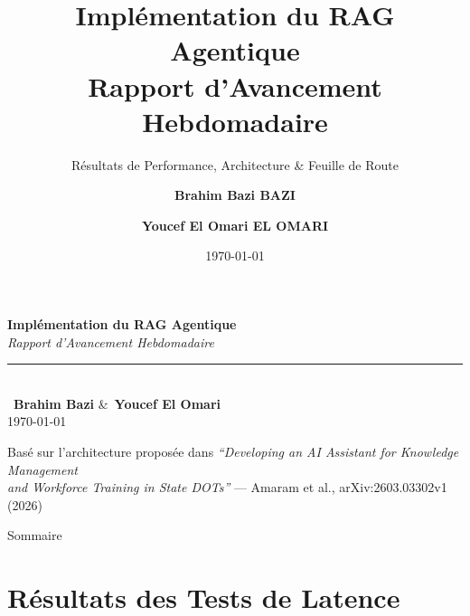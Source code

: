 \documentclass[aspectratio=169]{beamer}
\title[RAG Agentique — Rapport Hebdomadaire]{\textbf{Implémentation du RAG Agentique}\\Rapport d'Avancement Hebdomadaire}
\subtitle{Résultats de Performance, Architecture \& Feuille de Route}
\author[Brahim Bazi \& Youcef El Omari]{\textbf{Brahim Bazi BAZI} \and \textbf{Youcef El Omari EL OMARI}}
\date{\today}
\begin{document}
{
\begin{frame}[plain]
  \vspace{1.2cm}
  \begin{center}
    {\Huge\textbf{Implémentation du RAG Agentique}}\\[0.3cm]
    {\large\textit{Rapport d'Avancement Hebdomadaire}}\\[0.5cm]
    \rule{8cm}{0.4pt}\\[0.4cm]
    {\large \faUser\ \textbf{Brahim Bazi} \quad\&\quad \faUser\ \textbf{Youcef El Omari}}\\[0.3cm]
    {\small \today}
  \end{center}
  \vfill
  \begin{block}{}
    \centering\small
    Basé sur l'architecture proposée dans \emph{``Developing an AI Assistant for Knowledge Management\\
    and Workforce Training in State DOTs''} — Amaram et al., arXiv:2603.03302v1 (2026)
  \end{block}
\end{frame}
}

\begin{frame}{Sommaire}
  \tableofcontents
\end{frame}

\section{Résultats des Tests de Latence}
\end{document}
